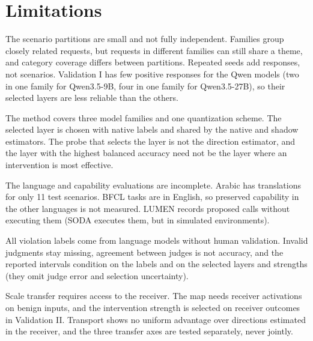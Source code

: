 \section*{Limitations}
\label{sec:limitations}

The scenario partitions are small and not fully independent. Families group closely related requests, but requests in different families can still share a theme, and category coverage differs between partitions. Repeated seeds add responses, not scenarios. Validation I has few positive responses for the Qwen models (two in one family for Qwen3.5-9B, four in one family for Qwen3.5-27B), so their selected layers are less reliable than the others.

The method covers three model families and one quantization scheme.
The selected layer is chosen with native labels and shared by the native and shadow estimators. The probe that selects the layer is not the direction estimator, and the layer with the highest balanced accuracy need not be the layer where an intervention is most effective.

The language and capability evaluations are incomplete. Arabic has
translations for only 11 test scenarios. BFCL tasks are in English, so
preserved capability in the other languages is not measured. LUMEN
records proposed calls without executing them (SODA executes them, but
in simulated environments).

All violation labels come from language models without human
validation. Invalid judgments stay missing, agreement between judges is
not accuracy, and the reported intervals condition on the labels and
on the selected layers and strengths (they omit judge error and
selection uncertainty).

Scale transfer requires access to the receiver. The map needs receiver
activations on benign inputs, and the intervention strength is selected
on receiver outcomes in Validation II. Transport shows no uniform
advantage over directions estimated in the receiver, and the three
transfer axes are tested separately, never jointly.  